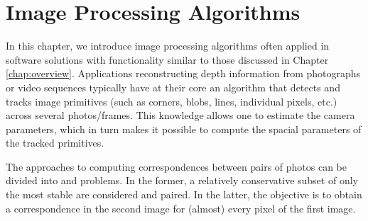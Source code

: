







\chapter{Image Processing Algorithms}

In this chapter, we introduce image processing algorithms often applied in software solutions with functionality similar to those discussed in Chapter \ref{chap:overview}. %
Applications reconstructing depth information from photographs or video sequences typically have at their core an algorithm that detects and tracks image primitives (such as corners, blobs, lines, individual pixels, etc.) across several photos/frames. 
This knowledge allows one to estimate the camera parameters, which in turn makes it possible to compute the spacial parameters of the tracked primitives.

The approaches to computing correspondences between pairs of photos can be divided into  and  problems. %
In the former, a relatively conservative subset of only the most stable  are considered and paired. %
In the latter, the objective is to obtain a correspondence in the second image for (almost) every pixel of the first image. 

